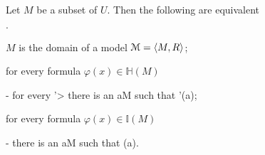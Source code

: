 \documentclass[10pt,oneside]{amsproc}
\newcommand{\mylabel}[1]{{#1}\hfill}
\renewenvironment{itemize}
  {\begin{list}{$\cdot$}{%
  \setlength{\parskip}{0mm}
  \setlength{\topsep}{.2\baselineskip}
  \setlength{\rightmargin}{0mm}
  \setlength{\listparindent}{0mm}
  \setlength{\itemindent}{0mm}
  \setlength{\labelwidth}{3ex}
  \setlength{\itemsep}{.2\baselineskip}
  \setlength{\parsep}{.2\baselineskip}
  \setlength{\partopsep}{0mm}
  \setlength{\labelsep}{1ex}
  \setlength{\leftmargin}{\labelwidth+\labelsep}
  \let\makelabel\mylabel}}{%
\end{list}}
\begin{document}
\begin{proposition}
  Let $M$ be a subset of $U$.
  Then the following are equivalent
  \begin{itemize}
    \item[1.] $M$ is the domain of a model ${\EuScript M}=\langle M,R\rangle$;
    \item[2.] for every formula $\varphi(x)\in\mathds{H}(M)$
    
    \noindent\kern-\leftmargin
    {\textrm{ for every }\varphi'>\varphi\textrm{ there is an }a\in M\textrm{ such that }\varphi'(a);}
    \item[3.] for every formula $\varphi(x)\in\mathds{I}(M)$
    
    \noindent\kern-\leftmargin
    {\textrm{ there is an }a\in M\textrm{ such that }\neg\varphi(a).}
    
  \end{itemize}
\end{proposition}
\end{document}
